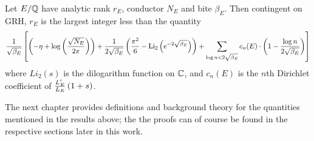 \begin{corollary}[\ref{cor:sinc_squared_sum_with_bite}]
Let $E/\mathbb{Q}$ have analytic rank $r_E$, conductor $N_E$ and bite $\beta_E$. Then contingent on GRH, $r_E$ is the largest integer less than the quantity
\begin{equation}
\frac{1}{\sqrt{\beta_E}}\left[\left(-\eta + \log\left(\frac{\sqrt{N_E}}{2\pi}\right)\right)+ \frac{1}{2 \sqrt{\beta_E}}\left(\frac{\pi^2}{6} - \text{Li}_2\left(e^{-2\sqrt{\beta_E}}\right)\right) + \sum_{\log n<2\sqrt{\beta_E}} c_n(E) \cdot \left(1-\frac{\log n}{2\sqrt{\beta_E}}\right)\right]
\end{equation}
where $Li_2(s)$ is the dilogarithm function on $\mathbb{C}$, and $c_n(E)$ is the $n$th Dirichlet coefficient of $\frac{L_E^{\prime}}{L_E}\left(1+s\right)$.
\end{corollary}

The next chapter provides definitions and background theory for the quantities mentioned in the results above; the the proofs can of course be found in the respective sections later in this work.

